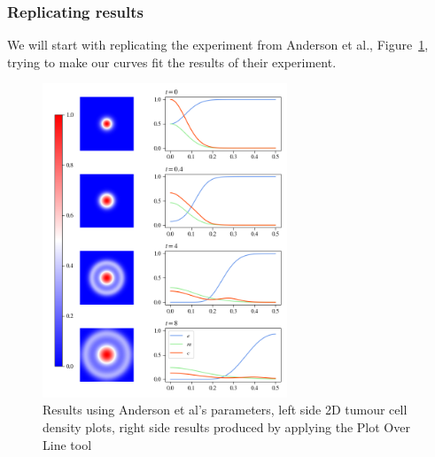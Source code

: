 \subsubsection{Replicating results}
We will start with replicating the experiment from  Anderson et al.\cite{anderson_mathematical_2000}, Figure~\ref{fig:unadjsuted_replication}, trying to make our curves fit the results of their experiment. 

\begin{figure}
    \centering
    \includegraphics[width=0.65\textwidth]{resources/images/first_replication_results.png}
    \caption{Results using Anderson et al's parameters, left side 2D tumour cell density plots, right side results produced by applying the Plot Over Line tool}
    \label{fig:unadjsuted_replication}
\end{figure}

